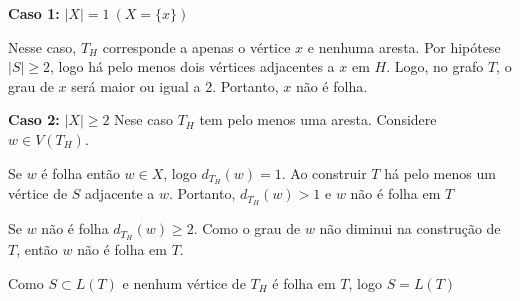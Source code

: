 \documentclass[12pt, a4paper]{article}
\begin{document}
  \textbf{Caso 1:} $|X| = 1 \ (X = \{x\})$

  Nesse caso, $T_H$ corresponde a apenas o vértice $x$ e nenhuma aresta.
  Por hipótese $|S| \ge 2$, logo há pelo menos dois vértices adjacentes a
  $x$ em $H$. Logo, no grafo $T$, o grau de $x$ será maior ou igual a 2.
  Portanto, $x$ não é folha.

  \textbf{Caso 2:} $|X| \ge 2 $
  Nese caso $T_H$ tem pelo menos uma aresta. Considere $w \in V(T_H)$.

  Se $w$ é folha então $w \in X$, logo $d_{T_H}(w) =1$. Ao construir $T$
  há pelo menos um vértice de $S$ adjacente a $w$. Portanto, $d_{T_H}(w) > 1$
  e $w$ não é folha em $T$

  Se $w$ não é folha $d_{T_H}(w) \ge 2$. Como o grau de $w$ não diminui
  na construção de $T$, então $w$ não é folha em $T$.

  Como $S \subset L(T)$ e nenhum vértice de $T_H$ é folha em $T$, logo
  $S = L(T)$
\end{document}
